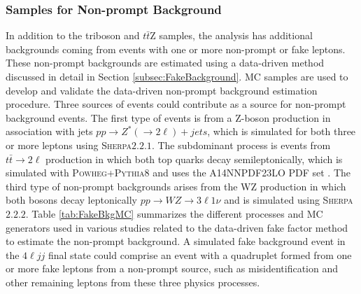 \subsubsection{Samples for Non-prompt Background}
\label{subsubsec:FakeBkgSamples}
In addition to the triboson and $t\bar{t}$Z samples, the analysis has additional backgrounds coming from events with one or more non-prompt or fake leptons. These non-prompt backgrounds are estimated using a data-driven method discussed in detail in Section \ref{subsec:FakeBackground}. MC samples are used to develop and validate the data-driven non-prompt background estimation procedure. Three sources of events could contribute as a source for non-prompt background events. The first type of events is from a Z-boson production in association with jets $pp \rightarrow Z^{*} (\rightarrow 2\ell) +jets$, which is simulated for both three or more leptons using \textsc{Sherpa}$2.2.1$. The subdominant process is events from $t\bar{t}\rightarrow 2\ell$ production in which both top quarks decay semileptonically, which is simulated with \textsc{Powheg+Pythia8} and uses the A14NNPDF23LO PDF set \cite{PowhegPythia}. The third type of non-prompt backgrounds arises from the WZ production in which both bosons decay leptonically $pp \rightarrow WZ \rightarrow 3 \ell 1\nu $ and is simulated using \textsc{Sherpa}$2.2.2$. Table \ref{tab:FakeBkgMC} summarizes the different processes and MC generators used in various studies related to the data-driven fake factor method to estimate the non-prompt background. A simulated fake background event in the $4\ell jj$ final state could comprise an event with a quadruplet formed from one or more fake leptons from a non-prompt source, such as misidentification and other remaining leptons from these three physics processes.

